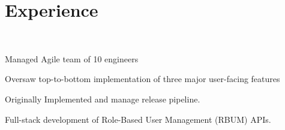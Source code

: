 \documentclass[]{csaund_resume-openfont}
\begin{document}
\begin{minipage}[t]{0.66\textwidth}


\section{Experience}
 \\

\vspace{\topsep} %
\begin{tightemize}
\item Managed Agile team of 10 engineers 
\item Oversaw top-to-bottom implementation of three major user-facing features
\end{tightemize}

\begin{tightemize}
\item Originally Implemented and manage release pipeline.
\item Full-stack development of Role-Based User Management (RBUM) APIs.
\end{tightemize}
\sectionsep


\end{minipage}
\end{document}
